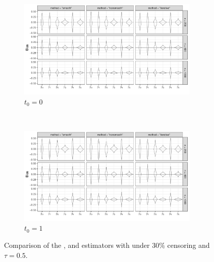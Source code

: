 \begin{figure}[ht]
  \centering
  \begin{subfigure}[b]{1.0\textwidth}
    \includegraphics[width = 0.95\textwidth]{vplot_t0_c3_Q50}
    \caption{$t_0 = 0$}
    \label{fig:sim1t0}
  \end{subfigure}
 \\[3ex]
  \begin{subfigure}[b]{1.0\textwidth}
    \includegraphics[width = 0.95\textwidth]{vplot_t1_c3_Q50}
    \caption{$t_0 = 1$}
    \label{fig:sim1t1}
  \end{subfigure}
  \caption{\label{fig:sim1}Comparison of the ,  and  estimators with 
    under 30\% censoring and $\tau = 0.5$.}
\end{figure}

